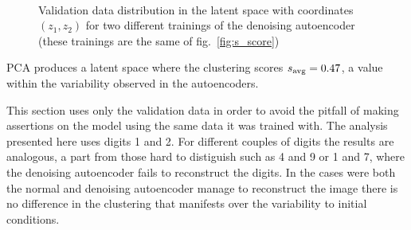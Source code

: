 \documentclass[twocolumn,gsifonts,twoside]{gsipaper}
\begin{document}
\begin{figure}
  \\[-2ex]
  \caption{Validation data distribution in the latent space with coordinates $(z_1, z_2)$ for two different trainings of the denoising autoencoder (these trainings are the same of fig.~\ref{fig:s_score})}
  \label{fig:scatter}
\end{figure}

PCA produces a latent space where the clustering scores $s_\textup{avg} = 0.47$, a value within the variability observed in the autoencoders.

This section uses only the validation data in order to avoid the pitfall of making assertions on the model using the same data it was trained with. The analysis presented here uses digits 1 and 2. For different couples of digits the results are analogous, a part from those hard to distiguish such as 4 and 9 or 1 and 7, where the denoising autoencoder fails to reconstruct the digits. In the cases were both the normal and denoising autoencoder manage to reconstruct the image there is no difference in the clustering that manifests over the variability to initial conditions.
\end{document}
